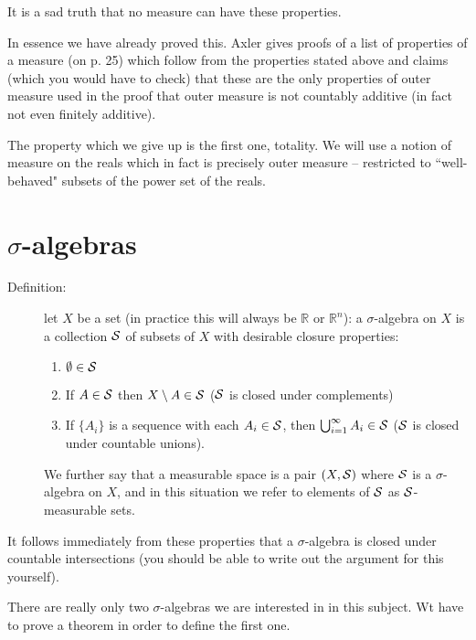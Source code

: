 \documentclass[12pt]{article}
\begin{document}
It is a sad truth that no measure can have these properties.  

In essence we have already proved this.  Axler gives proofs of a list of properties of a measure (on p. 25)  which follow from the properties stated above and claims (which you would have to check)
that these are the only properties of outer measure used in the proof that outer measure is not countably additive (in fact not even finitely additive).

The property which we give up is the first one, totality.  We will use a notion of measure on the reals which in fact is precisely outer measure -- restricted to ``well-behaved" subsets of the power set of the reals.

\section{$\sigma$-algebras}
\begin{description}
\item[Definition:]let $X$ be a set (in practice this will always be $\mathbb R$ or $\mathbb R^n$):  a $\sigma$-algebra on $X$ is a collection $\cal S$ of subsets of $X$ with desirable closure properties:

\begin{enumerate}
\item $\emptyset \in \cal S$

\item If $A \in \cal S$ then $X \setminus A \in \cal S$ ($\cal S$ is closed under complements)

\item  If $\{A_i\}$ is a sequence with each $A_i \in \cal S$, then $\bigcup_{i=1}^\infty A_i \in \cal S$ ($\cal S$ is closed under countable unions).

\end{enumerate}

We further say that a measurable space is a pair $(X,\cal S)$ where $\cal S$ is a $\sigma$-algebra on $X$, and in this situation we refer to elements of $\cal  S$ as $\cal S$-measurable sets.

\end{description}

It follows immediately from these properties that a $\sigma$-algebra is closed under countable intersections (you should be able to write out the argument for this yourself).

There are really only two $\sigma$-algebras we are interested in in this subject.  Wt have to prove a theorem in order to define the first one.
\end{document}
